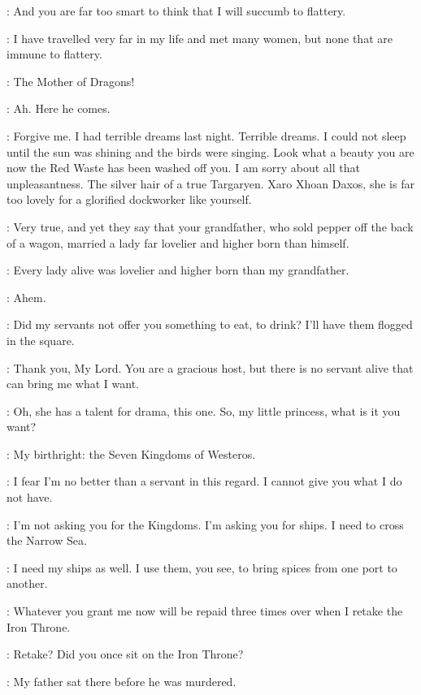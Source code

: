 \DAENERYS: And you are far too smart to think that I will succumb to flattery. 

\XARO: I have travelled very far in my life and met many women, but none that are immune to flattery. 


\SPICEKING: The Mother of Dragons! 

\XARO: Ah. Here he comes. 

\SPICEKING: Forgive me. I had terrible dreams last night. Terrible dreams. I could not sleep until the sun was shining and the birds were singing. Look what a beauty you are now the Red Waste has been washed off you. I am sorry about all that unpleasantness. The silver hair of a true Targaryen. Xaro Xhoan Daxos, she is far too lovely for a glorified dockworker like yourself. 

\XARO: Very true, and yet they say that your grandfather, who sold pepper off the back of a wagon, married a lady far lovelier and higher born than himself. 

\SPICEKING: Every lady alive was lovelier and higher born than my grandfather. 

\DAENERYS: Ahem. 

\SPICEKING: Did my servants not offer you something to eat, to drink? I'll have them flogged in the square. 

\DAENERYS: Thank you, My Lord. You are a gracious host, but there is no servant alive that can bring me what I want. 

\SPICEKING: Oh, she has a talent for drama, this one. So, my little princess, what is it you want? 

\DAENERYS: My birthright: the Seven Kingdoms of Westeros. 

\SPICEKING: I fear I'm no better than a servant in this regard. I cannot give you what I do not have. 

\DAENERYS: I'm not asking you for the Kingdoms. I'm asking you for ships. I need to cross the Narrow Sea. 

\SPICEKING: I need my ships as well. I use them, you see, to bring spices from one port to another. 

\DAENERYS: Whatever you grant me now will be repaid three times over when I retake the Iron Throne. 

\SPICEKING: Retake? Did you once sit on the Iron Throne? 

\DAENERYS: My father sat there before he was murdered. 

